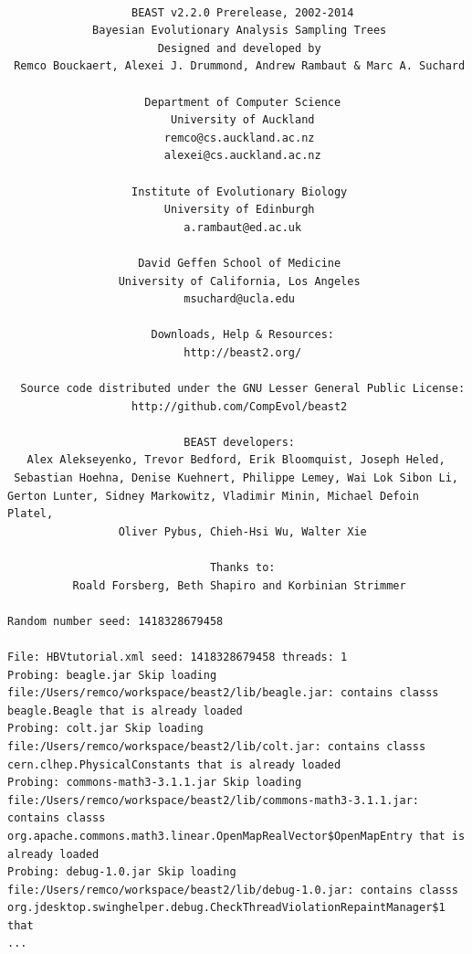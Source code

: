 \documentclass{article}
\begin{document}
{\scriptsize   
\begin{verbatim}

                   BEAST v2.2.0 Prerelease, 2002-2014
             Bayesian Evolutionary Analysis Sampling Trees
                       Designed and developed by
 Remco Bouckaert, Alexei J. Drummond, Andrew Rambaut & Marc A. Suchard
                                    
                     Department of Computer Science
                         University of Auckland
                        remco@cs.auckland.ac.nz
                        alexei@cs.auckland.ac.nz
                                    
                   Institute of Evolutionary Biology
                        University of Edinburgh
                           a.rambaut@ed.ac.uk
                                    
                    David Geffen School of Medicine
                 University of California, Los Angeles
                           msuchard@ucla.edu
                                    
                      Downloads, Help & Resources:
                           http://beast2.org/
                                    
  Source code distributed under the GNU Lesser General Public License:
                   http://github.com/CompEvol/beast2
                                    
                           BEAST developers:
   Alex Alekseyenko, Trevor Bedford, Erik Bloomquist, Joseph Heled, 
 Sebastian Hoehna, Denise Kuehnert, Philippe Lemey, Wai Lok Sibon Li, 
Gerton Lunter, Sidney Markowitz, Vladimir Minin, Michael Defoin Platel, 
                 Oliver Pybus, Chieh-Hsi Wu, Walter Xie
                                    
                               Thanks to:
          Roald Forsberg, Beth Shapiro and Korbinian Strimmer

Random number seed: 1418328679458

File: HBVtutorial.xml seed: 1418328679458 threads: 1
Probing: beagle.jar Skip loading file:/Users/remco/workspace/beast2/lib/beagle.jar: contains classs beagle.Beagle that is already loaded
Probing: colt.jar Skip loading file:/Users/remco/workspace/beast2/lib/colt.jar: contains classs cern.clhep.PhysicalConstants that is already loaded
Probing: commons-math3-3.1.1.jar Skip loading file:/Users/remco/workspace/beast2/lib/commons-math3-3.1.1.jar: contains classs org.apache.commons.math3.linear.OpenMapRealVector$OpenMapEntry that is already loaded
Probing: debug-1.0.jar Skip loading file:/Users/remco/workspace/beast2/lib/debug-1.0.jar: contains classs org.jdesktop.swinghelper.debug.CheckThreadViolationRepaintManager$1 that 
...

\end{verbatim}}
\end{document}
